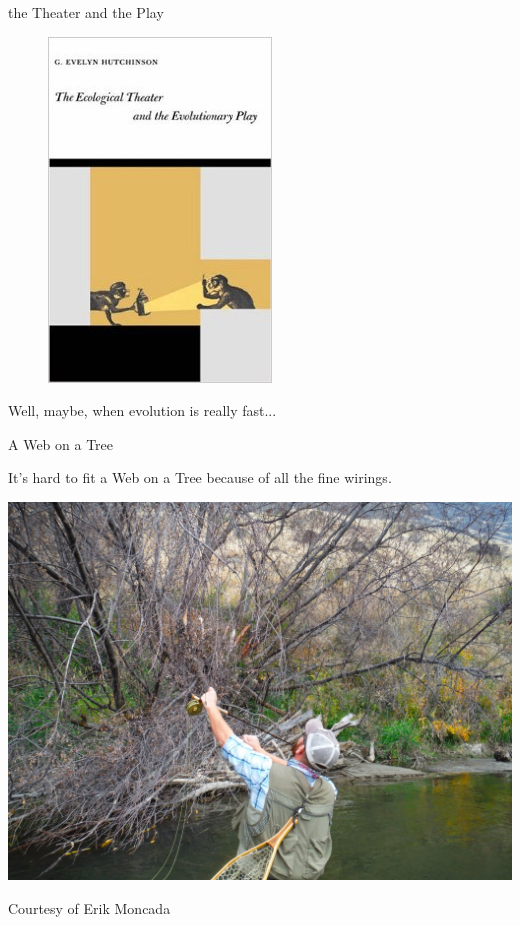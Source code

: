 \documentclass[]{beamer}
\begin{document}
\begin{frame}{the Theater and the Play}

\begin{figure}
\centering
\includegraphics[height=0.5 \textheight]{images/hutchinson_ecotheatreevoplay.jpg}
\end{figure}
\centering
{\tiny Well, maybe, when evolution is really fast...}

\end{frame}

\begin{frame}{A Web on a Tree}

\centering
It's hard to fit a Web on a Tree because of all the fine wirings.

\centering
\includegraphics[height=0.5 \textheight]{images/finewirings.jpg}

\centering
{\tiny Courtesy of Erik Moncada}

\end{frame}
\end{document}
